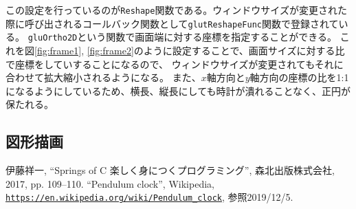 \documentclass[a4j,titlepage]{jsarticle}
\begin{document}
この設定を行っているのが\texttt{Reshape}関数である。ウィンドウサイズが変更された際に呼び出されるコールバック関数として\texttt{glutReshapeFunc}関数で登録されている。
\texttt{gluOrtho2D}という関数で画面端に対する座標を指定することができる。
これを図\ref{fig:frame1}, \ref{fig:frame2}のように設定することで、画面サイズに対する比で座標をしていすることになるので、
ウィンドウサイズが変更されてもそれに合わせて拡大縮小されるようになる。
また、$x$軸方向と$y$軸方向の座標の比を1:1になるようにしているため、横長、縦長にしても時計が潰れることなく、正円が保たれる。

\subsection{図形描画}


\begin{thebibliography}{9}
   伊藤祥一, ``Springs of C 楽しく身につくプログラミング'', 森北出版株式会社, 2017, pp. 109--110.
   ``Pendulum clock'', Wikipedia, \texttt{\url{https://en.wikipedia.org/wiki/Pendulum_clock}}, 参照2019/12/5.
\end{thebibliography}
\end{document}
